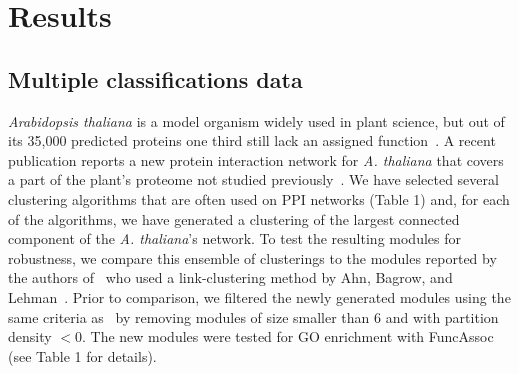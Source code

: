 \documentclass[12pt]{cmuthesis}
\newcommand{\Athal}{\textit{A. thaliana}\xspace}
\begin{document}
\section{Results}

  \subsection{Multiple classifications data}
  \label{sec:data}

  \textit{Arabidopsis thaliana} is a model organism widely used in plant science, but out of its 35,000 predicted proteins one third still lack an assigned function~\cite{Kerrien2011}. A recent publication reports a new protein interaction network for \Athal that covers a part of the plant's proteome not studied previously~\cite{Vidal2011}. We have selected several clustering algorithms that are often used on PPI networks (Table 1) and, for each of the algorithms, we have generated a clustering of the largest connected component of the \Athal's network. To test the resulting modules for robustness, we compare this ensemble of clusterings to the modules reported by the authors of~\cite{Vidal2011} who used a link-clustering method by Ahn, Bagrow, and Lehman~\cite{Ahn2010}. Prior to comparison, we filtered the newly generated modules using the same criteria as~\cite{Vidal2011} by removing modules of size smaller than 6 and with partition density $< 0$. The new modules were tested for GO enrichment with FuncAssoc~\cite{Berriz2009} (see Table 1 for details).
\end{document}

